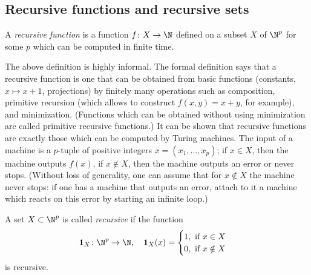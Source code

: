 \begin{page}
\setcounter{section}{3}
\setcounter{subsection}{4}
\setcounter{dfn}{24}
\label{portion:735}

\subsection{Recursive functions and recursive sets}

\end{page}

\begin{page}
\setcounter{section}{3}
\setcounter{subsection}{4}
\setcounter{dfn}{25}
\label{portion:737}

\begin{dfn}
A \emph{recursive function} is a function $f \colon X \to \N$ defined on a subset $X$ of $\N^p$ for some $p$
which can be computed in finite time.
\end{dfn}

\end{page}

\begin{page}
\setcounter{section}{3}
\setcounter{subsection}{4}
\setcounter{dfn}{25}
\label{portion:738}

The above definition is highly informal.
The formal definition says that a recursive function is one that can be obtained from basic functions
(constants, $x \mapsto x+1$, projections) by finitely many operations such as composition,
primitive recursion (which allows to construct $f(x,y) = x+y$, for example), and minimization.
(Functions which can be obtained without using minimization are called primitive recursive functions.)
It can be shown that recursive functions are exactly those which can be computed by Turing machines.
The input of a machine is a $p$-tuple of positive integers $x = (x_1, \ldots, x_p)$;
if $x \in X$, then the machine outputs $f(x)$, if $x \notin X$, then the machine outputs an error or never stops.
(Without loss of generality, one can assume that for $x \notin X$ the machine never stops: if one has a machine that outputs an error,
attach to it a machine which reacts on this error by starting an infinite loop.)



\end{page}

\begin{page}
\setcounter{section}{3}
\setcounter{subsection}{4}
\setcounter{dfn}{26}
\label{portion:740}

\begin{dfn}
A set $X \subset \N^p$ is called \emph{recursive} if the function
\[
\mathbf{1}_X \colon \N^p \to \N, \quad \mathbf{1}_X(x) =
\begin{cases}
1, \text{ if }x \in X\\
0, \text{ if }x \notin X
\end{cases}
\]
is recursive.
\end{dfn}

\end{page}


